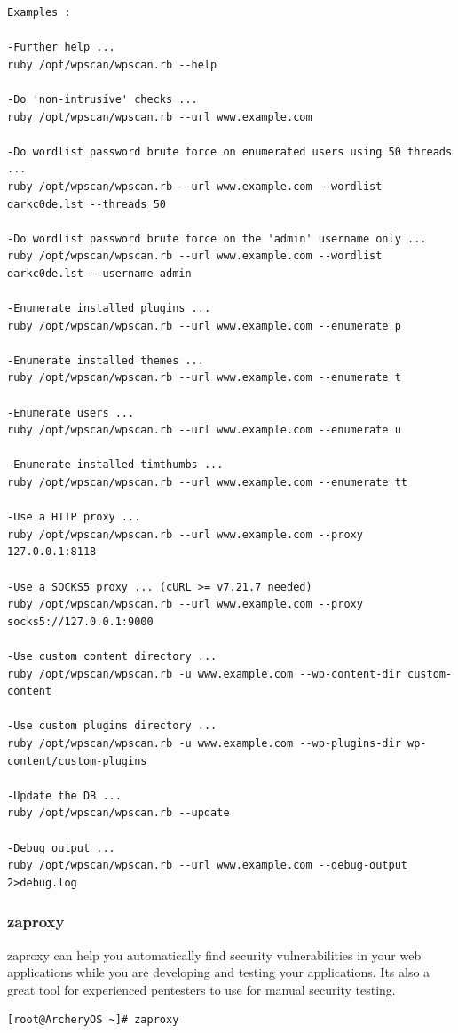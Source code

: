 \documentclass{article}
\begin{document}
\begin{lstlisting}
Examples :

-Further help ...
ruby /opt/wpscan/wpscan.rb --help

-Do 'non-intrusive' checks ...
ruby /opt/wpscan/wpscan.rb --url www.example.com

-Do wordlist password brute force on enumerated users using 50 threads ...
ruby /opt/wpscan/wpscan.rb --url www.example.com --wordlist darkc0de.lst --threads 50

-Do wordlist password brute force on the 'admin' username only ...
ruby /opt/wpscan/wpscan.rb --url www.example.com --wordlist darkc0de.lst --username admin

-Enumerate installed plugins ...
ruby /opt/wpscan/wpscan.rb --url www.example.com --enumerate p

-Enumerate installed themes ...
ruby /opt/wpscan/wpscan.rb --url www.example.com --enumerate t

-Enumerate users ...
ruby /opt/wpscan/wpscan.rb --url www.example.com --enumerate u

-Enumerate installed timthumbs ...
ruby /opt/wpscan/wpscan.rb --url www.example.com --enumerate tt

-Use a HTTP proxy ...
ruby /opt/wpscan/wpscan.rb --url www.example.com --proxy 127.0.0.1:8118

-Use a SOCKS5 proxy ... (cURL >= v7.21.7 needed)
ruby /opt/wpscan/wpscan.rb --url www.example.com --proxy socks5://127.0.0.1:9000

-Use custom content directory ...
ruby /opt/wpscan/wpscan.rb -u www.example.com --wp-content-dir custom-content

-Use custom plugins directory ...
ruby /opt/wpscan/wpscan.rb -u www.example.com --wp-plugins-dir wp-content/custom-plugins

-Update the DB ...
ruby /opt/wpscan/wpscan.rb --update

-Debug output ...
ruby /opt/wpscan/wpscan.rb --url www.example.com --debug-output 2>debug.log
\end{lstlisting}

\subsubsection{zaproxy}
zaproxy can help you automatically find security vulnerabilities in your web applications while you are developing and testing your applications. Its also a great tool for experienced pentesters to use for manual security testing. 
\begin{lstlisting}
[root@ArcheryOS ~]# zaproxy
\end{lstlisting}
\end{document}
